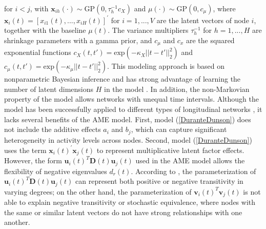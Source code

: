 \documentclass[a4paper]{article}
\begin{document}
		for $i<j$, with $\boldsymbol{x}_{ih}(\cdot) \sim \mbox{GP}(0, \tau_h^{-1}c_X)$ and $\mu(\cdot) \sim \mbox{GP}(0, c_\mu)$,
		where $\boldsymbol{x}_i(t)=[x_{i1}(t),...,x_{iH}(t)]^\prime$ for $i = 1,...,V$ are the latent vectors of node $i$, together with the baseline $\mu(t)$. The variance multipliers $\tau_h^{-1}$ for $h=1,...,H$ are shrinkage parameters with a gamma prior, and $c_\mu$ and $c_x$ are the squared exponential functions $c_X(t, t') = \mbox{exp}(-\kappa_X||t-t'||_2^2)$ and $c_\mu(t, t') = \mbox{exp}(-\kappa_\mu||t-t'||_2^2)$. This modeling approach is based on nonparametric Bayesian inference and has strong advantage of learning the number of latent dimensions $H$ in the model \citep{bhattacharya2011sparse}. In addition, the non-Markovian property of the model allows networks with unequal time intervals. Although the model has been successfully applied to different types of longitudinal networks \citep{durante2014bayesian2,durante2014bayesian}, it lacks several benefits of the AME model. First, model (\ref{DuranteDunson}) does not include the additive effects $a_i$ and $b_j$, which can capture significant heterogeneity in activity levels across nodes. Second, model (\ref{DuranteDunson}) uses the term $\boldsymbol{x}_i(t)^\prime \boldsymbol{x}_j(t)$ to represent multiplicative latent factor effects. However, the form $\boldsymbol{u}_i(t)^T\mathbf{D}(t)\boldsymbol{u}_j(t)$ used in the AME model allows the flexibility of negative eigenvalues $d_r(t)$. According to \cite{hoff2008modeling}, the parameterization of $\boldsymbol{u}_i(t)^T\mathbf{D}(t)\boldsymbol{u}_j(t)$ can represent both positive or negative transitivity in varying degrees; on the other hand, the parameterization of $\boldsymbol{v}_i(t)^T\boldsymbol{v}_j(t)$ is not able to explain negative transitivity or stochastic equivalence, where nodes with the same or similar latent vectors do not have strong relationships with one another.\\ \newline
\end{document}
